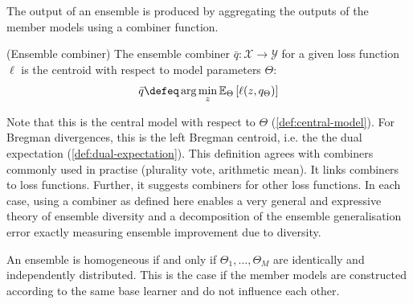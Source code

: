 \documentclass[
	twoside=false, %
]{kaobook}
\begin{document}
The output of an ensemble is produced by aggregating the outputs of the member models using a combiner function. 
\begin{definition}
   \label{def:ensemble-combiner}
   (Ensemble combiner) The ensemble combiner $\bar{q} : \mathcal{X} \to \mathcal{Y}$ for a given loss function $\ell$ is the centroid with respect to model parameters $\Theta$: 
$$
\bar{q} \defeq \arg\min_z \mathbb{E}_\Theta \left[ \ell(z, q_\Theta) \right]
$$
\end{definition}
Note that this is the central model with respect to $\Theta$ (\cf \ref{def:central-model}).
For Bregman divergences, this is the left Bregman centroid, i.e. the the dual expectation (\cf \ref{def:dual-expectation}). This definition agrees with combiners commonly used in practise (plurality vote, arithmetic mean). It links combiners to loss functions. Further, it suggests combiners for other loss functions. In each case, using a combiner as defined here enables a very general and expressive theory of ensemble diversity and a decomposition of the ensemble generalisation error exactly measuring ensemble improvement due to diversity.

An ensemble is homogeneous if and only if $\Theta_{1}, \dots, \Theta_{M}$ are identically and independently distributed. This is the case if the member models are constructed according to the same base learner and do not influence each other. 
\end{document}

